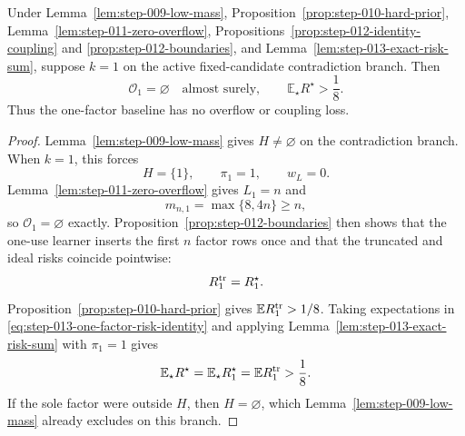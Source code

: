 \begin{proposition}
\label{prop:step-013-one-factor-baseline}
Under Lemma~\ref{lem:step-009-low-mass},
Proposition~\ref{prop:step-010-hard-prior},
Lemma~\ref{lem:step-011-zero-overflow},
Propositions~\ref{prop:step-012-identity-coupling} and
\ref{prop:step-012-boundaries}, and
Lemma~\ref{lem:step-013-exact-risk-sum}, suppose \(k=1\) on the active
fixed-candidate contradiction branch.  Then
\begin{equation}\label{eq:step-013-one-factor-floor}
\mathcal O_1=\varnothing\quad\text{almost surely},
\qquad
\mathbb E_\star R^\star>\frac18.
\end{equation}
Thus the one-factor baseline has no overflow or coupling loss.
\end{proposition}

\begin{proof}
Lemma~\ref{lem:step-009-low-mass} gives \(H\ne\varnothing\) on the
contradiction branch.  When \(k=1\), this forces
\begin{equation}\label{eq:step-013-one-factor-active-set}
H=\{1\},
\qquad
\pi_1=1,
\qquad
w_L=0.
\end{equation}
Lemma~\ref{lem:step-011-zero-overflow} gives \(L_1=n\) and
\begin{equation}\label{eq:step-013-one-factor-budget}
m_{n,1}=\max\{8,4n\}\ge n,
\end{equation}
so \(\mathcal O_1=\varnothing\) exactly.
Proposition~\ref{prop:step-012-boundaries} then shows that the one-use
learner inserts the first \(n\) factor rows once and that the truncated
and ideal risks coincide pointwise:
\begin{equation}\label{eq:step-013-one-factor-risk-identity}
R_1^{\rm tr}=R_1^\star.
\end{equation}
Proposition~\ref{prop:step-010-hard-prior} gives
\(\mathbb E R_1^{\rm tr}>1/8\).  Taking expectations in
\eqref{eq:step-013-one-factor-risk-identity} and applying
Lemma~\ref{lem:step-013-exact-risk-sum} with \(\pi_1=1\) gives
\begin{equation}\label{eq:step-013-one-factor-chain}
\mathbb E_\star R^\star
=\mathbb E_\star R_1^\star
=\mathbb E R_1^{\rm tr}
>\frac18.
\end{equation}
If the sole factor were outside \(H\), then \(H=\varnothing\), which
Lemma~\ref{lem:step-009-low-mass} already excludes on this branch.
\end{proof}

